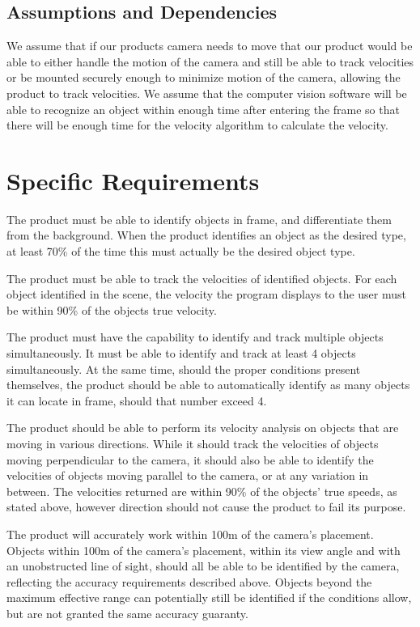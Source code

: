 \documentclass[letterpaper,10pt,onecolumn,draftclsnofoot]{IEEEtran}
\begin{document}
\subsection{Assumptions and Dependencies}
We assume that if our products camera needs to move that our product would be able to either handle the motion of the camera and still be able to track velocities or be mounted securely enough to minimize motion of the camera, allowing the product to track velocities.
We assume that the computer vision software will be able to recognize an object within enough time after entering the frame so that there will be enough time for the velocity algorithm to calculate the velocity.

\section{Specific Requirements}
The product must be able to identify objects in frame, and differentiate them from the background.
When the product identifies an object as the desired type, at least 70\% of the time this must actually be the desired object type.

The product must be able to track the velocities of identified objects.
For each object identified in the scene, the velocity the program displays to the user must be within 90\% of the objects true velocity.

The product must have the capability to identify and track multiple objects simultaneously.
It must be able to identify and track at least 4 objects simultaneously.
At the same time, should the proper conditions present themselves, the product should be able to automatically identify as many objects it can locate in frame, should that number exceed 4.

The product should be able to perform its velocity analysis on objects that are moving in various directions.
While it should track the velocities of objects moving perpendicular to the camera, it should also be able to identify the velocities of objects moving parallel to the camera, or at any variation in between.
The velocities returned are within 90\% of the objects' true speeds, as stated above, however direction should not cause the product to fail its purpose.

The product will accurately work within 100m of the camera's placement.
Objects within 100m of the camera's placement, within its view angle and with an unobstructed line of sight, should all be able to be identified by the camera, reflecting the accuracy requirements described above.
Objects beyond the maximum effective range can potentially still be identified if the conditions allow, but are not granted the same accuracy guaranty.
\end{document}
